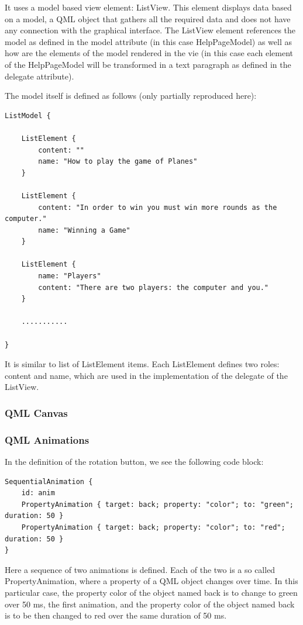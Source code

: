 It uses a model based view element: ListView. This element displays data based on a model, a QML object that gathers all the required data and does not have any connection with the graphical interface. The ListView element references the model as defined in the model attribute (in this case HelpPageModel) as well as how are the elements of the model rendered in the vie (in this case each element of the HelpPageModel will be transformed in a text paragraph as defined in the delegate attribute).

The model itself is defined as follows (only partially reproduced here):

\begin{lstlisting}
ListModel {

	ListElement {
		content: ""
		name: "How to play the game of Planes"
	}
	
	ListElement {
		content: "In order to win you must win more rounds as the computer."
		name: "Winning a Game"
	}
	
	ListElement {
		name: "Players"
		content: "There are two players: the computer and you."
	}
	
	...........
	
}
\end{lstlisting}

It is similar to list of ListElement items. Each ListElement defines two roles: content and name, which are used in the implementation of the delegate of the ListView.

\subsubsection {QML Canvas}

\subsubsection {QML Animations} \label{qml:animation}

In the definition of the rotation button, we see the following code block:

\begin{lstlisting}
SequentialAnimation {
	id: anim
	PropertyAnimation { target: back; property: "color"; to: "green"; duration: 50 }
	PropertyAnimation { target: back; property: "color"; to: "red"; duration: 50 }
}
\end{lstlisting}

Here a sequence of two animations is defined. Each of the two is a so called PropertyAnimation, where a property of a QML object changes over time. In this particular case, the property color of the object named back is to change to green over 50 ms, the first animation, and the property color of the object named back is to be then changed to red over the same duration of 50 ms.


